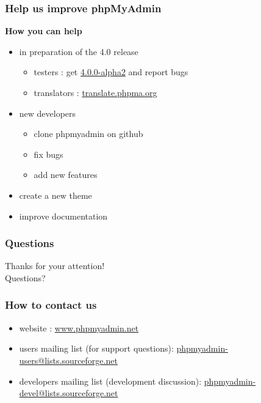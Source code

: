 \documentclass[14pt]{beamer}
\begin{document}
  \begin{frame}
  \frametitle{Help us improve phpMyAdmin}
    \textbf{{\color{PmaOlive}How you can help}}
    \pause
    \begin{itemize}[<+->]
      \item in preparation of the 4.0 release
        \begin{itemize}[<+->]
	  \item testers : get \href{http://www.phpmyadmin.net/}{4.0.0-alpha2} and report bugs
	  \item translators : \href{http://translate.phpma.org/}{translate.phpma.org}
	\end{itemize}
      \item new developers
	\begin{itemize}[<+->]
          \item clone phpmyadmin on github
          \item fix bugs
          \item add new features
	\end{itemize}
      \item create a new theme
      \item improve documentation
    \end{itemize}
  \end{frame}
  \begin{frame}
  \frametitle{Questions}
    Thanks for your attention!\\
    Questions?
  \end{frame}
  \begin{frame}
    \frametitle{How to contact us}
    \begin{itemize}
      \item website : \href{http://www.phpmyadmin.net/}{www.phpmyadmin.net}
      \item users mailing list (for support questions): \href{mailto:phpmyadmin-users@lists.sourceforge.net}{phpmyadmin-users@lists.sourceforge.net}
      \item developers mailing list (development discussion): \href{mailto:phpmyadmin-devel@lists.sourceforge.net}{phpmyadmin-devel@lists.sourceforge.net}
    \end{itemize}
  \end{frame}
\end{document}
